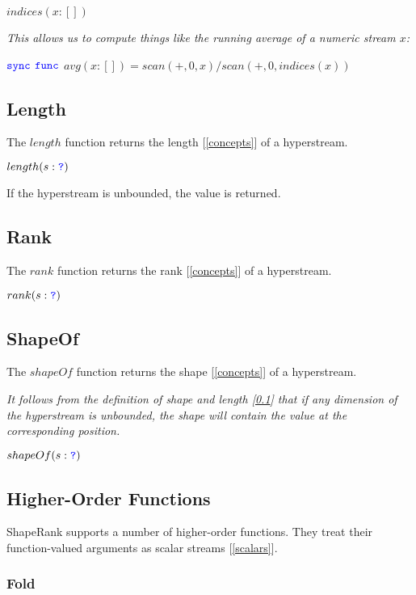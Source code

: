 \documentclass{article}
\begin{document}
$indices(x: [])$

{\em
This allows us to compute things like the running average of a numeric stream $x$:

$\texttt{\color{blue} sync}{}$  $\texttt{\color{blue} func}{}$ $avg(x:[]) = scan(+, 0, x)/scan(+, 0, indices(x))$
}

\subsection{Length}
\label{length}

The $length$ function returns the length [\ref{concepts}] of a hyperstream.

$length(s: \texttt{\color{blue} ?}{})$

If the hyperstream is unbounded, the value \QUESTIONMARK{} is returned.

\subsection{Rank}
\label{rank}

The $rank$ function returns the rank [\ref{concepts}] of a hyperstream.

$rank(s: \texttt{\color{blue} ?}{})$

\subsection{ShapeOf}
\label{shapeOf}

The $shapeOf$ function returns the shape [\ref{concepts}] of a hyperstream.

{\em 
It follows from the  definition of shape and length [\ref{length}] that
if any  dimension of the hyperstream is unbounded, the shape will contain the value \QUESTIONMARK{} at the corresponding  position.
}

$shapeOf(s: \texttt{\color{blue} ?}{})$

\subsection{Higher-Order Functions}
\label{higherOrderFunctions}

ShapeRank supports a number of higher-order functions. They treat their function-valued arguments as scalar streams [\ref{scalars}]. 


\subsubsection{Fold}
\label{fold}
\end{document}
